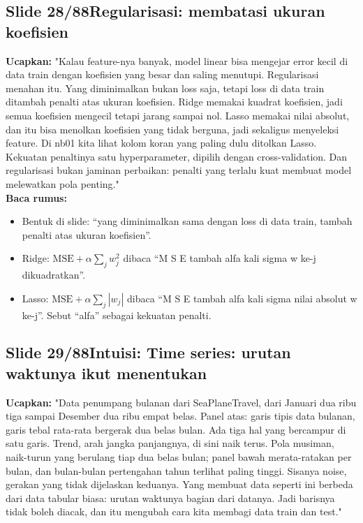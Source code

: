 \documentclass[11pt]{article}
\renewcommand{\framebox}[1]{\colorbox{acc!15}{\textcolor{acc}{\textbf{#1}}}}
\begin{document}
\subsection*{\framebox{Slide 28/88}\quad Regularisasi: membatasi ukuran koefisien}
\textbf{Ucapkan:} "Kalau feature-nya banyak, model linear bisa mengejar error kecil di data train dengan koefisien yang besar dan saling menutupi. Regularisasi menahan itu. Yang diminimalkan bukan loss saja, tetapi loss di data train ditambah penalti atas ukuran koefisien. Ridge memakai kuadrat koefisien, jadi semua koefisien mengecil tetapi jarang sampai nol. Lasso memakai nilai absolut, dan itu bisa menolkan koefisien yang tidak berguna, jadi sekaligus menyeleksi feature. Di nb01 kita lihat kolom koran yang paling dulu ditolkan Lasso. Kekuatan penaltinya satu hyperparameter, dipilih dengan cross-validation. Dan regularisasi bukan jaminan perbaikan: penalti yang terlalu kuat membuat model melewatkan pola penting."\\[2pt]
\textbf{Baca rumus:}\\[2pt]
\begin{itemize}\setlength\itemsep{0.2em}
\item Bentuk di slide: ``yang diminimalkan sama dengan loss di data train, tambah penalti atas ukuran koefisien''.
\item Ridge: $\text{MSE} + \alpha\sum_j w_j^2$ dibaca ``M S E tambah alfa kali sigma w ke-j dikuadratkan''.
\item Lasso: $\text{MSE} + \alpha\sum_j |w_j|$ dibaca ``M S E tambah alfa kali sigma nilai absolut w ke-j''. Sebut ``alfa'' sebagai kekuatan penalti.
\end{itemize}

\subsection*{\framebox{Slide 29/88}\quad Intuisi: Time series: urutan waktunya ikut menentukan}
\textbf{Ucapkan:} "Data penumpang bulanan dari SeaPlaneTravel, dari Januari dua ribu tiga sampai Desember dua ribu empat belas. Panel atas: garis tipis data bulanan, garis tebal rata-rata bergerak dua belas bulan. Ada tiga hal yang bercampur di satu garis. Trend, arah jangka panjangnya, di sini naik terus. Pola musiman, naik-turun yang berulang tiap dua belas bulan; panel bawah merata-ratakan per bulan, dan bulan-bulan pertengahan tahun terlihat paling tinggi. Sisanya noise, gerakan yang tidak dijelaskan keduanya. Yang membuat data seperti ini berbeda dari data tabular biasa: urutan waktunya bagian dari datanya. Jadi barisnya tidak boleh diacak, dan itu mengubah cara kita membagi data train dan test."\\[2pt]
\end{document}
